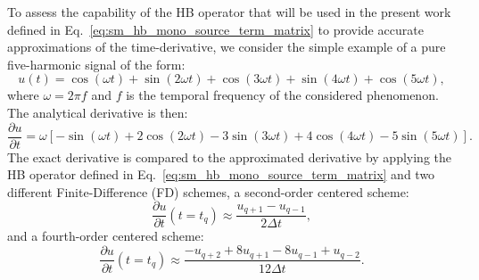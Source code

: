 
To assess the capability of the HB operator that will be used in the present work 
defined in Eq.~\eqref{eq:sm_hb_mono_source_term_matrix} to
provide accurate approximations of the time-derivative, 
we consider the simple example of a pure
five-harmonic signal of the form:
\begin{equation}
    \label{eq:sum_sin}
    u(t) = \cos(\omega t) + \sin(2 \omega t) +
    \cos(3 \omega t) + \sin(4 \omega t) + \cos(5 \omega t),
\end{equation}
where $\omega = 2 \pi f$ and $f$ is the temporal frequency of
the considered phenomenon.
The analytical derivative is then:
\begin{equation}
    \label{eq:sum_sin_deriv}
    \frac{\partial u}{\partial t} = 
    \omega\left[ -\sin(\omega t) + 
    2\cos(2 \omega t) -
    3\sin(3 \omega t) + 
    4\cos(4 \omega t) -
    5\sin(5 \omega t)\right].
\end{equation}
The exact derivative is compared to the approximated derivative by applying 
the HB operator defined in Eq.~\eqref{eq:sm_hb_mono_source_term_matrix}
and two different Finite-Difference (FD) schemes,
a second-order centered scheme:
\begin{equation}
    \frac{\partial u}{\partial t} (t=t_q) \approx 
    \frac{u_{q+1} - u_{q-1}}{2 \Delta t},
    \label{eq:hb_op_center2}
\end{equation}
and a fourth-order centered scheme:
\begin{equation}
    \frac{\partial u}{\partial t} (t=t_q) \approx 
    \frac{-u_{q+2} + 8 u_{q+1} - 8 u_{q-1} + u_{q-2}}{12\Delta t}.
    \label{eq:hb_op_center4}
\end{equation}

